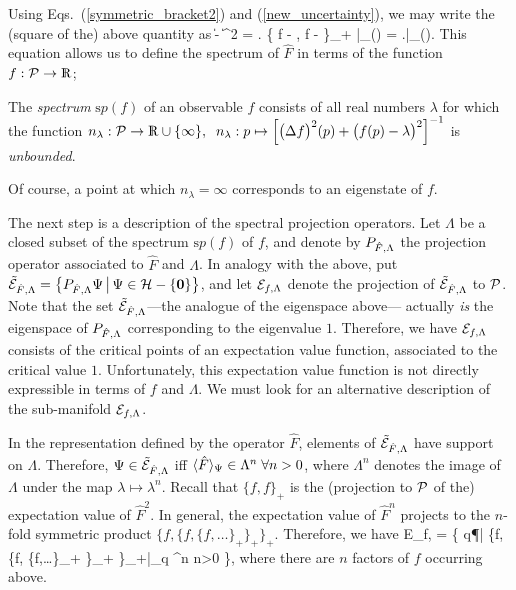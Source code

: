 Using Eqs.~(\ref{symmetric_bracket2}) and (\ref{new_uncertainty}), we
may write the (square of the) above quantity as
%
\be
\| \Psi - \lambda \Psi \|^2 =
\left. \{ f - \lambda, f - \lambda \}_+ \right|_{\pi(\Psi)} =
\left. \right|_{\pi(\Psi)}.
\ee
%
This equation allows us to define the spectrum of $\hat{F}$ in terms
of the function $f:\P\rightarrow\R$;
%
\begin{definition}
The {\em spectrum} ${\mathrm sp}(f)$ of an observable $f$ consists of
all real numbers $\lambda$ for which the function $n_{\lambda} : \P
\rightarrow \R \cup \{\infty\}, \;\; n_{\lambda} : p \mapsto \left[
\big(\Delta f\big)^2(p) + \big(f(p) - \lambda\big)^2 \right]^{-1}$ is
{\em unbounded}.
\end{definition}
%
\noindent
Of course, a point at which $n_\lambda = \infty$ corresponds to an
eigenstate of $f$.

The next step is a description of the spectral projection operators.
Let $\Lambda$ be a closed subset of the spectrum ${\mathrm sp}(f)$ of
$f$, and denote by ${\Bbb P}_{\hat{F}, \Lambda}$ the projection
operator associated to $\hat{F}$ and $\Lambda$. In analogy with the
above, put $\tilde{\cal E}_{\hat{F}, \Lambda} = \big\{ {\Bbb
P}_{\hat{F}, \Lambda}\Psi \, \big| \, \Psi\in\H - \{{\mathbf0}\}
\big\}$, and let ${\cal E}_{f, \Lambda}$ denote the projection of
$\tilde{\cal E}_{\hat{F}, \Lambda}$ to $\P$.  Note that the set
$\tilde{\cal E}_{\hat{F}, \Lambda}$---the analogue of the eigenspace
above--- actually {\em is} the eigenspace of ${\Bbb P}_{\hat{F},
\Lambda}$ corresponding to the eigenvalue $1$.  Therefore, we have
${\cal E}_{f, \Lambda}$ consists of the critical points of an
expectation value function, associated to the critical value $1$.
Unfortunately, this expectation value function is not directly
expressible in terms of $f$ and $\Lambda$.  We must look for an
alternative description of the sub-manifold ${\cal E}_{f, \Lambda}$.

In the representation defined by the operator $\hat{F}$, elements of
$\tilde{\cal E}_{\hat{F}, \Lambda}$ have support on $\Lambda$.
Therefore, $\Psi \in \tilde{\cal E}_{\hat{F}, \Lambda}$ iff $\<
\hat{F} \>_\Psi \in \Lambda^n \; \forall n>0$, where $\Lambda^n$
denotes the image of $\Lambda$ under the map $\lambda \mapsto
\lambda^n$.  Recall that $\{f, f\}_+$ is the (projection to $\P$ of
the) expectation value of $\hat{F}^2$.  In general, the expectation
value of $\hat{F}^n$ projects to the $n$-fold symmetric product $\{f,
\{f, \{f, \ldots\}_+ \}_+ \}_+$.  Therefore, we have
%
\be\label{eq-E-defined}
{\cal E}_{f, \Lambda} = \{ q\in\P \big| 
	\{f, \{f, \{f,\ldots\}_+ \}_+ \}_+\big|_q
	\in \Lambda^n \; \forall n>0 \},
\ee
%
where there are $n$ factors of $f$ occurring above.

